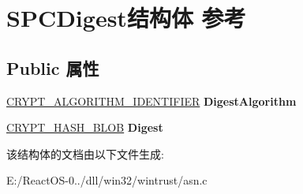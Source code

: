 \hypertarget{struct_s_p_c_digest}{}\section{S\+P\+C\+Digest结构体 参考}
\label{struct_s_p_c_digest}
\subsection*{Public 属性}
\begin{DoxyCompactItemize}
\item 
\mbox{\label{struct_s_p_c_digest_a91a8f661e78c482e0a630c575c0b7b17}} 
\hyperlink{struct___c_r_y_p_t___a_l_g_o_r_i_t_h_m___i_d_e_n_t_i_f_i_e_r}{C\+R\+Y\+P\+T\+\_\+\+A\+L\+G\+O\+R\+I\+T\+H\+M\+\_\+\+I\+D\+E\+N\+T\+I\+F\+I\+ER} {\bfseries Digest\+Algorithm}
\item 
\mbox{\label{struct_s_p_c_digest_a6a4e7e0981828249be888799cd068ab8}} 
\hyperlink{struct___c_r_y_p_t_o_a_p_i___b_l_o_b}{C\+R\+Y\+P\+T\+\_\+\+H\+A\+S\+H\+\_\+\+B\+L\+OB} {\bfseries Digest}
\end{DoxyCompactItemize}


该结构体的文档由以下文件生成\+:\begin{DoxyCompactItemize}
\item 
E\+:/\+React\+O\+S-\/0../dll/win32/wintrust/asn.\+c\end{DoxyCompactItemize}
